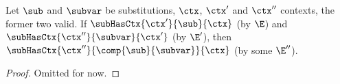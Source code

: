 \begin{lemma}
\label{lem:composition-concrete-substitutions}
Let $\sub$ and $\subvar$ be substitutions, $\ctx$, $\ctx'$ and $\ctx''$ contexts, the former two valid.
If $\subHasCtx{\ctx'}{\sub}{\ctx}$ (by $\E$) and $\subHasCtx{\ctx''}{\subvar}{\ctx'}$ (by $\E'$), then $\subHasCtx{\ctx''}{\comp{\sub}{\subvar}}{\ctx}$ (by some $\E''$).
\end{lemma}

\begin{proof}
Omitted for now.
\end{proof}

